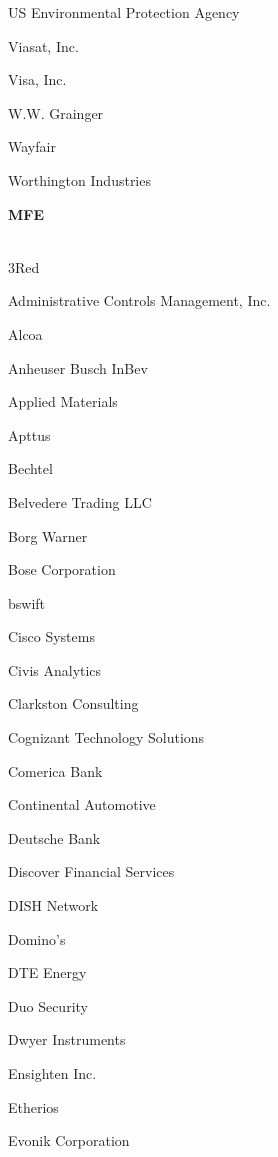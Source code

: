 \documentclass[twoside]{article}
\begin{document}
\begin{center}
\begin{multicols}{5}
\begin{FlushLeft}
\begin{compactitem}
\item US Environmental Protection Agency
\item Viasat, Inc.
\item Visa, Inc.
\item W.W. Grainger
\item Wayfair
\item Worthington Industries
\end{compactitem}
        \end{FlushLeft}
        \vspace{1em}
        {\fontsize{14}{16}\selectfont \bf MFE}\\
        \vspace{-1em}
        ~\hrulefill~
        \vspace{-.9em}
        \begin{FlushLeft}
        \begin{compactitem}
        \item 3Red
\item Administrative Controls Management, Inc.
\item Alcoa
\item Anheuser Busch InBev
\item Applied Materials
\item Apttus
\item Bechtel
\item Belvedere Trading LLC
\item Borg Warner
\item Bose Corporation
\item bswift
\item Cisco Systems
\item Civis Analytics
\item Clarkston Consulting
\item Cognizant Technology Solutions
\item Comerica Bank
\item Continental Automotive
\item Deutsche Bank
\item Discover Financial Services
\item DISH Network
\item Domino's
\item DTE Energy
\item Duo Security
\item Dwyer Instruments
\item Ensighten Inc.
\item Etherios
\item Evonik Corporation

\end{compactitem}
\end{FlushLeft}
\end{multicols}
\end{center}
\end{document}
